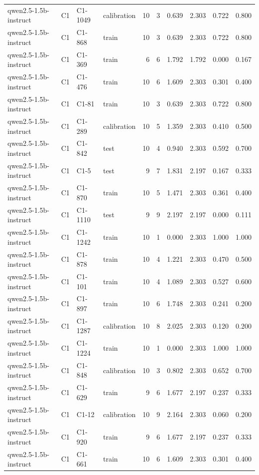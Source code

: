 \begin{table}
\begin{tabular}{llllrrrrrr}
qwen2.5-1.5b-instruct & C1 & C1-1049 & calibration & 10 & 3 & 0.639 & 2.303 & 0.722 & 0.800 \\
qwen2.5-1.5b-instruct & C1 & C1-868 & train & 10 & 3 & 0.639 & 2.303 & 0.722 & 0.800 \\
qwen2.5-1.5b-instruct & C1 & C1-369 & train & 6 & 6 & 1.792 & 1.792 & 0.000 & 0.167 \\
qwen2.5-1.5b-instruct & C1 & C1-476 & train & 10 & 6 & 1.609 & 2.303 & 0.301 & 0.400 \\
qwen2.5-1.5b-instruct & C1 & C1-81 & train & 10 & 3 & 0.639 & 2.303 & 0.722 & 0.800 \\
qwen2.5-1.5b-instruct & C1 & C1-289 & calibration & 10 & 5 & 1.359 & 2.303 & 0.410 & 0.500 \\
qwen2.5-1.5b-instruct & C1 & C1-842 & test & 10 & 4 & 0.940 & 2.303 & 0.592 & 0.700 \\
qwen2.5-1.5b-instruct & C1 & C1-5 & test & 9 & 7 & 1.831 & 2.197 & 0.167 & 0.333 \\
qwen2.5-1.5b-instruct & C1 & C1-870 & train & 10 & 5 & 1.471 & 2.303 & 0.361 & 0.400 \\
qwen2.5-1.5b-instruct & C1 & C1-1110 & test & 9 & 9 & 2.197 & 2.197 & 0.000 & 0.111 \\
qwen2.5-1.5b-instruct & C1 & C1-1242 & train & 10 & 1 & 0.000 & 2.303 & 1.000 & 1.000 \\
qwen2.5-1.5b-instruct & C1 & C1-878 & train & 10 & 4 & 1.221 & 2.303 & 0.470 & 0.500 \\
qwen2.5-1.5b-instruct & C1 & C1-101 & train & 10 & 4 & 1.089 & 2.303 & 0.527 & 0.600 \\
qwen2.5-1.5b-instruct & C1 & C1-897 & train & 10 & 6 & 1.748 & 2.303 & 0.241 & 0.200 \\
qwen2.5-1.5b-instruct & C1 & C1-1287 & calibration & 10 & 8 & 2.025 & 2.303 & 0.120 & 0.200 \\
qwen2.5-1.5b-instruct & C1 & C1-1224 & train & 10 & 1 & 0.000 & 2.303 & 1.000 & 1.000 \\
qwen2.5-1.5b-instruct & C1 & C1-848 & calibration & 10 & 3 & 0.802 & 2.303 & 0.652 & 0.700 \\
qwen2.5-1.5b-instruct & C1 & C1-629 & train & 9 & 6 & 1.677 & 2.197 & 0.237 & 0.333 \\
qwen2.5-1.5b-instruct & C1 & C1-12 & calibration & 10 & 9 & 2.164 & 2.303 & 0.060 & 0.200 \\
qwen2.5-1.5b-instruct & C1 & C1-920 & train & 9 & 6 & 1.677 & 2.197 & 0.237 & 0.333 \\
qwen2.5-1.5b-instruct & C1 & C1-661 & train & 10 & 6 & 1.609 & 2.303 & 0.301 & 0.400 \\

\end{tabular}
\end{table}
